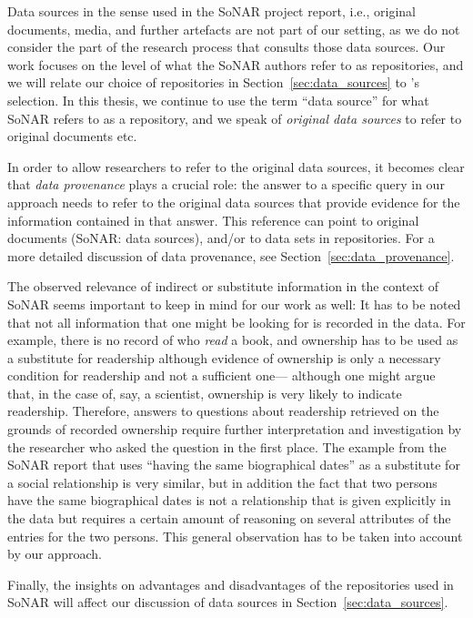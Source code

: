 Data sources in the sense used in the SoNAR project report,
i.e., original documents, media, and further artefacts
are not part of our setting, as we do not consider the part of the research process
that consults those data sources. Our work focuses on the level of
what the SoNAR authors refer to as repositories,
and we will relate our choice of repositories in Section~\ref{sec:data_sources}
to \citeauthor*{Menzel2020}'s \autocite*{Menzel2020} selection.
In this thesis, we continue to use the term \enquote{data source} for what
SoNAR refers to as a repository,
and we speak of \emph{original data sources} to refer to original documents etc.

In order to allow researchers to refer to the original data sources,
it becomes clear that \emph{data provenance} plays a crucial role:
the answer to a specific query in our approach needs to refer to
the original data sources that provide evidence for the information contained in that answer.
This reference can point to original documents (SoNAR: data sources),
and/or to data sets in repositories. For a more detailed discussion of data provenance,
see Section~\ref{sec:data_provenance}.

The observed relevance of indirect or substitute information in the context of SoNAR 
seems important to keep in mind for our work as well: 
It has to be noted that not all information that one might be looking for is recorded
in the data. For example, there is no record of who \emph{read} a book,
and ownership has to be used as a substitute for readership although evidence
of ownership is only a necessary condition for readership and not a sufficient one---%
although one might argue that, in the case of, say, a scientist, ownership is very likely
to indicate readership.
Therefore, answers to questions
about readership retrieved on the grounds of recorded ownership require further interpretation and investigation
by the researcher who asked the question in the first place.
The example from the SoNAR report that uses \enquote{having the same biographical dates}
as a substitute for a social relationship is very similar, but in addition
the fact that two persons have the same biographical dates is not a relationship that is
given explicitly in the data but requires a certain amount of reasoning on several attributes of the entries
for the two persons.
This general observation has to be taken into account by our approach.

Finally, the insights on advantages and disadvantages of the repositories used in SoNAR
will affect our discussion of data sources in Section~\ref{sec:data_sources}.

